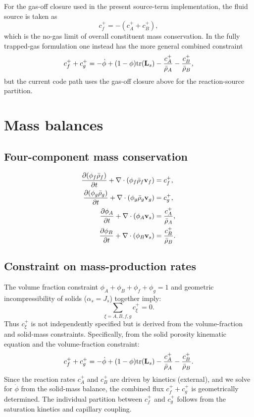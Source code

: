 \documentclass[11pt]{article}
\begin{document}
For the gas-off closure used in the present source-term implementation, the fluid source is taken as
\begin{equation}
  c_f^+ = -(c_A^+ + c_B^+),
\end{equation}
which is the no-gas limit of overall constituent mass conservation. In the fully trapped-gas formulation one instead has the more general combined constraint
\begin{equation}
  c_f^+ + c_g^+ = -\dot\phi + (1-\phi)\mathrm{tr}(\mathbf{L}_s) - \frac{c_A^+}{\bar\rho_A} - \frac{c_B^+}{\bar\rho_B},
\end{equation}
but the current code path uses the gas-off closure above for the reaction-source partition.

\section{Mass balances}
\label{sec:mass_balances}

\subsection{Four-component mass conservation}
\begin{subequations}
\begin{align}
\frac{\partial(\phi_f\bar\rho_f)}{\partial t}+\nabla\cdot(\phi_f\bar\rho_f\mathbf{v}_f)&=c_f^+,\label{eq:mb_f}\\
\frac{\partial(\phi_g\bar\rho_g)}{\partial t}+\nabla\cdot(\phi_g\bar\rho_g\mathbf{v}_g)&=c_g^+,\label{eq:mb_g}\\
\frac{\partial\phi_A}{\partial t}+\nabla\cdot(\phi_A\mathbf{v}_s)&=\frac{c_A^+}{\bar\rho_A},\label{eq:mb_A}\\
\frac{\partial\phi_B}{\partial t}+\nabla\cdot(\phi_B\mathbf{v}_s)&=\frac{c_B^+}{\bar\rho_B}.\label{eq:mb_B}
\end{align}
\end{subequations}

\subsection{Constraint on mass-production rates}
The volume fraction constraint $\phi_A + \phi_B + \phi_f + \phi_g = 1$ and geometric incompressibility of solids ($\alpha_s = J_s$) together imply:
\begin{equation}
\sum_{\xi=A,B,f,g} c_\xi^+ = 0.
\label{eq:mass_balance_constraint}
\end{equation}
Thus $c_\xi^+$ is not independently specified but is derived from the volume-fraction and solid-mass constraints. Specifically, from the solid porosity kinematic equation and the volume-fraction constraint:
\begin{equation}
c_f^+ + c_g^+ = -\dot\phi + (1-\phi)\mathrm{tr}(\mathbf{L}_s) - \frac{c_A^+}{\bar\rho_A} - \frac{c_B^+}{\bar\rho_B}.
\label{eq:c_fg_from_constraint}
\end{equation}
Since the reaction rates $c_A^+$ and $c_B^+$ are driven by kinetics (external), and we solve for $\dot\phi$ from the solid-mass balance, the combined flux $c_f^+ + c_g^+$ is geometrically determined. The individual partition between $c_f^+$ and $c_g^+$ follows from the saturation kinetics and capillary coupling.
\end{document}
